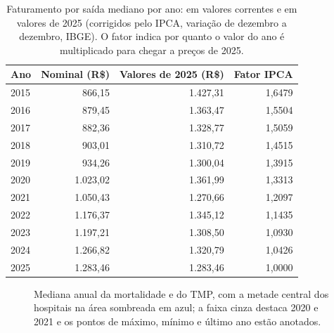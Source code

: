 \begin{table}[H]
\centering
\caption{Faturamento por saída mediano por ano: em valores correntes e em
valores de 2025 (corrigidos pelo IPCA, variação de dezembro a dezembro,
IBGE). O fator indica por quanto o valor do ano é multiplicado para
chegar a preços de 2025.}
\label{tab:custoreal}
\small
\begin{tabular}{lrrr}
\toprule
Ano & Nominal (R\$) & Valores de 2025 (R\$) & Fator IPCA \\
\midrule
2015 & 866,15   & 1.427,31 & 1,6479 \\
2016 & 879,45   & 1.363,47 & 1,5504 \\
2017 & 882,36   & 1.328,77 & 1,5059 \\
2018 & 903,01   & 1.310,72 & 1,4515 \\
2019 & 934,26   & 1.300,04 & 1,3915 \\
2020 & 1.023,02 & 1.361,99 & 1,3313 \\
2021 & 1.050,43 & 1.270,66 & 1,2097 \\
2022 & 1.176,37 & 1.345,12 & 1,1435 \\
2023 & 1.197,21 & 1.308,50 & 1,0930 \\
2024 & 1.266,82 & 1.320,79 & 1,0426 \\
2025 & 1.283,46 & 1.283,46 & 1,0000 \\
\bottomrule
\end{tabular}
\end{table}

\newpage
{}

\begin{figure}[H]
\centering
{}
\caption{Mediana anual da mortalidade e do TMP, com a metade central
dos hospitais na área sombreada em azul; a faixa cinza destaca 2020 e
2021 e os pontos de máximo, mínimo e último ano estão anotados.}
\label{fig:tendA}
\end{figure}

